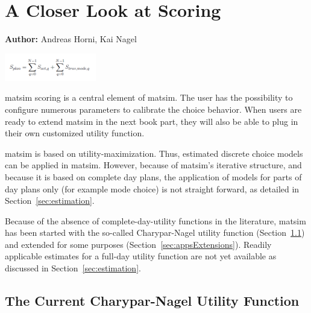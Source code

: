 \chapter{A Closer Look at Scoring}
\label{ch:scoring}

\hfill \textbf{Author:} Andreas Horni, Kai Nagel

\begin{center} \includegraphics[width=0.3\textwidth, angle=0]{using/figures/utf.png} \end{center}

\gls{matsim} scoring is a central element of \gls{matsim}. The user has the possibility to configure numerous parameters to calibrate the choice behavior. When users are ready to extend \gls{matsim} in the next book part, they will also be able to plug in their own customized utility function.

\gls{matsim} is based on \gls{utility}-maximization. Thus, estimated discrete choice models can be applied in \gls{matsim}. However, because of \gls{matsim}'s iterative structure, and because it is based on complete day plans, the application of models for parts of day plans only (for example mode choice) is not straight forward, as detailed in Section~\ref{sec:estimation}.


Because of the absence of complete-day-utility functions in the literature, \gls{matsim} has been started with the so-called Charypar-Nagel \gls{utility} function (Section~\ref{sec:charyparnagel}) and extended for some purposes (Section~\ref{sec:appsExtensions}). Readily applicable estimates for a full-day utility function are not yet available as discussed in Section~\ref{sec:estimation}.

\section{The Current Charypar-Nagel Utility Function}
\label{sec:charyparnagel}
